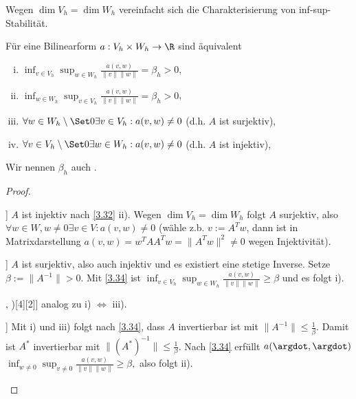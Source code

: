 Wegen $\dim V_h = \dim W_h$ vereinfacht sich die Charakterisierung von inf-sup-Stabilität.

\begin{st} \label{3.46}
	Für eine Bilinearform $a: V_h \times W_h \to \R$ sind äquivalent
	\begin{enumerate}[i)]
		\item
			$\inf_{v\in V_h} \sup_{w\in W_h} \frac{a(v,w)}{\|v\|\|w\|} = \beta_h > 0$,
		\item
			$\inf_{w\in W_h} \sup_{v\in V_h} \frac{a(v,w)}{\|v\|\|w\|} = \beta_h > 0$,
		\item
			$\forall w \in W_h \setminus \Set 0 \exists v \in V_h : a(v,w) \neq 0$ (d.h. $A$ ist surjektiv),
		\item
			$\forall v \in V_h \setminus \Set 0 \exists w \in W_h : a(v,w) \neq 0$ (d.h. $A$ ist injektiv),
	\end{enumerate}
	\begin{note}
		Wir nennen $\beta_h$ auch .
	\end{note}
	\begin{proof}
		\begin{seg}[\ProofImplication)[1][3]]
			$A$ ist injektiv nach \ref{3.32} ii).
			Wegen $\dim V_h = \dim W_h$ folgt $A$ surjektiv, also $\forall w \in W, w \neq 0 \exists v \in V: a(v,w) \neq 0$ (wähle z.b. $v := A^T w$, dann ist in Matrixdarstellung $a(v,w) = w^TA A^T w = \|A^T w\|^2 \neq 0$ wegen Injektivität).
		\end{seg}
		\begin{seg}[\ProofImplication)[3][1]]
			$A$ ist surjektiv, also auch injektiv und es existiert eine stetige Inverse.
			Setze $\beta := \|A^{-1}\| > 0$.
			Mit \ref{3.34} ist
			\begin{math}
				\inf_{v\in V_h} \sup_{w\in W_h} \frac{a(v,w)}{\|v\|\|w\|}
				\ge \beta
			\end{math}
			und es folgt i).
		\end{seg}
		\begin{seg}[\ProofImplication)[2][4], \ProofImplication)[4][2]]
			analog zu i) $\iff$ iii).
		\end{seg}
		\begin{seg}[\ProofImplication)[1][2]]
			Mit i) und iii) folgt nach \ref{3.34}, dass $A$ invertierbar ist mit $\|A^{-1}\| \le \frac{1}{\beta}$.
			Damit ist $A^*$ invertierbar mit $\|(A^*)^{-1}\| \le \frac{1}{\beta}$.
			Nach \ref{3.34} erfüllt $a(\argdot, \argdot)$
			\begin{math}
				\inf_{w\neq 0} \sup_{v\neq 0} \frac{a(v,w)}{\|v\|\|w\|}
				\ge \beta,
			\end{math}
			also folgt ii).
		\end{seg}
	\end{proof}
\end{st}

